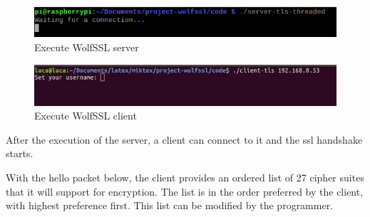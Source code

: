 \documentclass[a4paper,12pt]{article}
\begin{document}
\begin{figure}[H]
    \centering
    \includegraphics[scale=0.65]{./code/img/1-server.png}
    \caption{Execute WolfSSL server}
    
\end{figure}

\begin{figure}[H]
    \centering
    \includegraphics[scale=0.248]{./code/img/1-client.png}
    \caption{Execute WolfSSL client}
    
\end{figure}

After the execution of the server, a client can connect to it and the ssl handshake starts.

With the hello packet below, the client provides an ordered list of 27 cipher suites that it will support for encryption. The list is in the order preferred by the client, with highest preference first. This list can be modified by the programmer.
\end{document}

